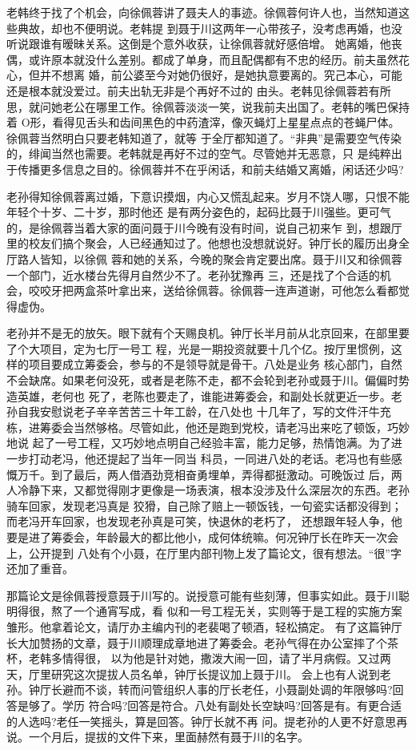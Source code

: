 \documentclass[11pt,a4paper,onecolumn]{article}
\begin{document}
老韩终于找了个机会，向徐佩蓉讲了聂夫人的事迹。徐佩蓉何许人也，当然知道这些典故，却也不便明说。老韩提
到聂于川这两年一心带孩子，没考虑再婚，也没听说跟谁有暧昧关系。这倒是个意外收获，让徐佩蓉就好感倍增。
她离婚，他丧偶，或许原本就没什么差别。都成了单身，而且配偶都有不忠的经历。前夫虽然花心，但并不想离
婚，前公婆至今对她仍很好，是她执意要离的。究己本心，可能还是根本就没爱过。前夫出轨无非是个再好不过的
由头。老韩见徐佩蓉若有所思，就问她老公在哪里工作。徐佩蓉淡淡一笑，说我前夫出国了。老韩的嘴巴保持着
O形，看得见舌头和齿间黑色的中药渣滓，像灭蝇灯上星星点点的苍蝇尸体。徐佩蓉当然明白只要老韩知道了，就等
于全厅都知道了。“非典”是需要空气传染的，绯闻当然也需要。老韩就是再好不过的空气。尽管她并无恶意，只
是纯粹出于传播更多信息之目的。徐佩蓉并不在乎闲话，和前夫结婚又离婚，闲话还少吗?

老孙得知徐佩蓉离过婚，下意识摸烟，内心又慌乱起来。岁月不饶人哪，只恨不能年轻个十岁、二十岁，那时他还
是有两分姿色的，起码比聂于川强些。更可气的，是徐佩蓉当着大家的面问聂于川今晚有没有时间，说自己初来乍
到，想跟厅里的校友们搞个聚会，人已经通知过了。他想也没想就说好。钟厅长的履历出身全厅路人皆知，以徐佩
蓉和她的关系，今晚的聚会肯定要出席。聂于川又和徐佩蓉一个部门，近水楼台先得月自然少不了。老孙犹豫再
三，还是找了个合适的机会，咬咬牙把两盒茶叶拿出来，送给徐佩蓉。徐佩蓉一连声道谢，可他怎么看都觉得虚伪。

老孙并不是无的放矢。眼下就有个天赐良机。钟厅长半月前从北京回来，在部里要了个大项目，定为七厅一号工
程，光是一期投资就要十几个亿。按厅里惯例，这样的项目要成立筹委会，参与的不是领导就是骨干。八处是业务
核心部门，自然不会缺席。如果老何没死，或者是老陈不走，都不会轮到老孙或聂于川。偏偏时势造英雄，老何也
死了，老陈也要走了，谁能进筹委会，和副处长就更近一步。老孙自我安慰说老子辛辛苦苦三十年工龄，在八处也
十几年了，写的文件汗牛充栋，进筹委会当然够格。尽管如此，他还是跑到党校，请老冯出来吃了顿饭，巧妙地说
起了一号工程，又巧妙地点明自己经验丰富，能力足够，热情饱满。为了进一步打动老冯，他还提起了当年一同当
科员，一同进八处的老话。老冯也有些感慨万千。到了最后，两人借酒劲竞相奋勇埋单，弄得都挺激动。可晚饭过
后，两人冷静下来，又都觉得刚才更像是一场表演，根本没涉及什么深层次的东西。老孙骑车回家，发现老冯真是
狡猾，自己除了赔上一顿饭钱，一句瓷实话都没得到；而老冯开车回家，也发现老孙真是可笑，快退休的老朽了，
还想跟年轻人争，他要是进了筹委会，年龄最大的都比他小，成何体统嘛。何况钟厅长在昨天一次会上，公开提到
八处有个小聂，在厅里内部刊物上发了篇论文，很有想法。“很”字还加了重音。

那篇论文是徐佩蓉授意聂于川写的。说授意可能有些刻薄，但事实如此。聂于川聪明得很，熬了一个通宵写成，看
似和一号工程无关，实则等于是工程的实施方案雏形。他拿着论文，请厅办主编内刊的老裴喝了顿酒，轻松搞定。
有了这篇钟厅长大加赞扬的文章，聂于川顺理成章地进了筹委会。老孙气得在办公室摔了个茶杯，老韩多情得很，
以为他是针对她，撒泼大闹一回，请了半月病假。又过两天，厅里研究这次提拔人员名单，钟厅长提议加上聂于川。
会上也有人说到老孙。钟厅长避而不谈，转而问管组织人事的厅长老任，小聂副处调的年限够吗?回答是够了。学历
符合吗?回答是符合。八处有副处长空缺吗?回答是有。有更合适的人选吗?老任一笑摇头，算是回答。钟厅长就不再
问。提老孙的人更不好意思再说。一个月后，提拔的文件下来，里面赫然有聂于川的名字。
\end{document}
